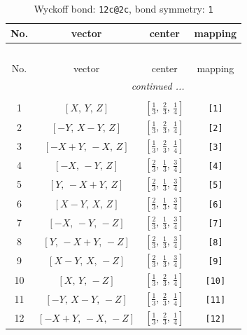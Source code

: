 \documentclass[fleqn,8pt]{jsarticle}
\begin{document}
\renewcommand{\arraystretch}{1.2}
\begin{longtable}{cccc}
\caption{Wyckoff bond: {\tt 12c@2c}, bond symmetry: {\tt 1}}
 \\
 \hline \hline
No. & vector & center & mapping \\ \hline \endfirsthead

\multicolumn{3}{l}{\tablename\ \thetable{}} \\
 \hline \hline
No. & vector & center & mapping \\ \hline \endhead

 \hline \hline
\multicolumn{3}{r}{\footnotesize\it continued ...} \\ \endfoot

 \hline \hline
\multicolumn{3}{r}{} \\ \endlastfoot

1 & $\left[ X,\, Y,\, Z \right]$ & $\left[ \frac{1}{3},\, \frac{2}{3},\, \frac{1}{4} \right]$ & {\tt [1]} \\ \hline
2 & $\left[ - Y,\, X - Y,\, Z \right]$ & $\left[ \frac{1}{3},\, \frac{2}{3},\, \frac{1}{4} \right]$ & {\tt [2]} \\ \hline
3 & $\left[ - X + Y,\, - X,\, Z \right]$ & $\left[ \frac{1}{3},\, \frac{2}{3},\, \frac{1}{4} \right]$ & {\tt [3]} \\ \hline
4 & $\left[ - X,\, - Y,\, Z \right]$ & $\left[ \frac{2}{3},\, \frac{1}{3},\, \frac{3}{4} \right]$ & {\tt [4]} \\ \hline
5 & $\left[ Y,\, - X + Y,\, Z \right]$ & $\left[ \frac{2}{3},\, \frac{1}{3},\, \frac{3}{4} \right]$ & {\tt [5]} \\ \hline
6 & $\left[ X - Y,\, X,\, Z \right]$ & $\left[ \frac{2}{3},\, \frac{1}{3},\, \frac{3}{4} \right]$ & {\tt [6]} \\ \hline
7 & $\left[ - X,\, - Y,\, - Z \right]$ & $\left[ \frac{2}{3},\, \frac{1}{3},\, \frac{3}{4} \right]$ & {\tt [7]} \\ \hline
8 & $\left[ Y,\, - X + Y,\, - Z \right]$ & $\left[ \frac{2}{3},\, \frac{1}{3},\, \frac{3}{4} \right]$ & {\tt [8]} \\ \hline
9 & $\left[ X - Y,\, X,\, - Z \right]$ & $\left[ \frac{2}{3},\, \frac{1}{3},\, \frac{3}{4} \right]$ & {\tt [9]} \\ \hline
10 & $\left[ X,\, Y,\, - Z \right]$ & $\left[ \frac{1}{3},\, \frac{2}{3},\, \frac{1}{4} \right]$ & {\tt [10]} \\ \hline
11 & $\left[ - Y,\, X - Y,\, - Z \right]$ & $\left[ \frac{1}{3},\, \frac{2}{3},\, \frac{1}{4} \right]$ & {\tt [11]} \\ \hline
12 & $\left[ - X + Y,\, - X,\, - Z \right]$ & $\left[ \frac{1}{3},\, \frac{2}{3},\, \frac{1}{4} \right]$ & {\tt [12]} \\
\end{longtable}
\end{document}
